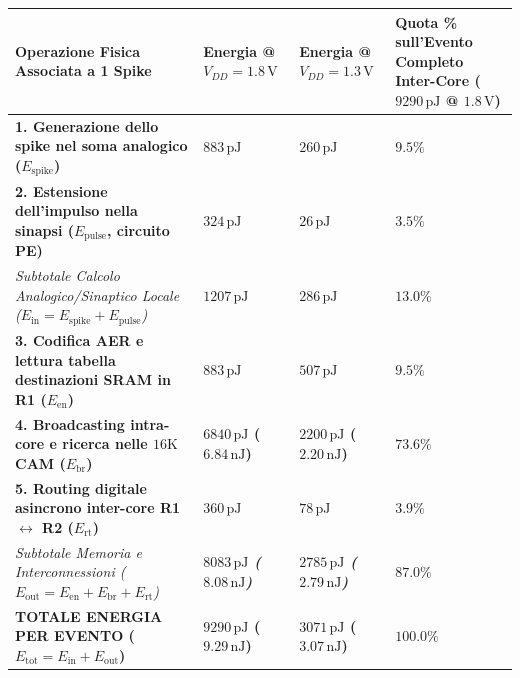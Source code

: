 \documentclass[11pt,a4paper]{article}
\begin{document}
\begin{center}
\scriptsize
\renewcommand{\arraystretch}{1.3}
\begin{tabularx}{\textwidth}{|>{\raggedright\arraybackslash}X|>{\raggedright\arraybackslash}X|>{\raggedright\arraybackslash}X|>{\raggedright\arraybackslash}X|}
\hline
\textbf{Operazione Fisica Associata a 1 Spike} & \textbf{Energia @ $V_{DD} = 1.8\,\text{V}$} & \textbf{Energia @ $V_{DD} = 1.3\,\text{V}$} & \textbf{Quota \% sull'Evento Completo Inter-Core ($9290\,\text{pJ}$ @ $1.8\,\text{V}$)} \\ \hline \hline
\textbf{1. Generazione dello spike nel soma analogico ($E_{\text{spike}}$)} & \textbf{$883\,\text{pJ}$} & \textbf{$260\,\text{pJ}$} & \textbf{$9.5\%$} \\ \hline
\textbf{2. Estensione dell'impulso nella sinapsi ($E_{\text{pulse}}$, circuito PE)} & \textbf{$324\,\text{pJ}$} & \textbf{$26\,\text{pJ}$} & \textbf{$3.5\%$} \\ \hline
\textit{Subtotale Calcolo Analogico/Sinaptico Locale ($E_{\text{in}} = E_{\text{spike}} + E_{\text{pulse}}$)} & \textbf{\textit{$1207\,\text{pJ}$}} & \textbf{\textit{$286\,\text{pJ}$}} & \textbf{\textit{$13.0\%$}} \\ \hline
\textbf{3. Codifica AER e lettura tabella destinazioni SRAM in R1 ($E_{\text{en}}$)} & \textbf{$883\,\text{pJ}$} & \textbf{$507\,\text{pJ}$} & \textbf{$9.5\%$} \\ \hline
\textbf{4. Broadcasting intra-core e ricerca nelle $16\text{K}$ CAM ($E_{\text{br}}$)} & \textbf{$6840\,\text{pJ}$ ($6.84\,\text{nJ}$)} & \textbf{$2200\,\text{pJ}$ ($2.20\,\text{nJ}$)} & \textbf{$73.6\%$} \\ \hline
\textbf{5. Routing digitale asincrono inter-core R1 $\leftrightarrow$ R2 ($E_{\text{rt}}$)} & \textbf{$360\,\text{pJ}$} & \textbf{$78\,\text{pJ}$} & \textbf{$3.9\%$} \\ \hline
\textit{Subtotale Memoria e Interconnessioni ($E_{\text{out}} = E_{\text{en}} + E_{\text{br}} + E_{\text{rt}}$)} & \textbf{\textit{$8083\,\text{pJ}$ ($8.08\,\text{nJ}$)} } & \textbf{\textit{$2785\,\text{pJ}$ ($2.79\,\text{nJ}$)} } & \textbf{\textit{$87.0\%$}} \\ \hline
\textbf{TOTALE ENERGIA PER EVENTO ($E_{\text{tot}} = E_{\text{in}} + E_{\text{out}}$)} & \textbf{$9290\,\text{pJ}$ ($9.29\,\text{nJ}$)} & \textbf{$3071\,\text{pJ}$ ($3.07\,\text{nJ}$)} & \textbf{$100.0\%$} \\ \hline
\end{tabularx}
\end{center}
\normalsize
\end{document}

